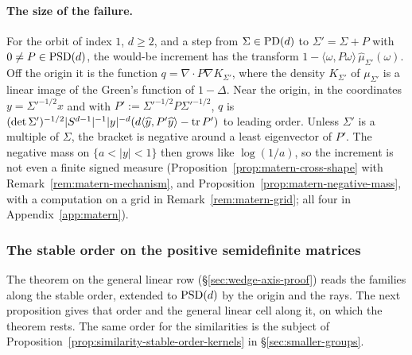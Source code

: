 \paragraph{The size of the failure.} For the \Matern{} orbit of index $1$, $d \ge 2$, and a step from
$\Sigma \in \mathrm{PD}(d)$ to $\Sigma' = \Sigma + P$ with $0 \ne P \in \mathrm{PSD}(d)$, the would-be increment has the
transform $1 - \langle\omega,P\omega\rangle\,\widehat\mu_{\Sigma'}(\omega)$. Off the origin it is the
function $q = \nabla\cdot P\nabla K_{\Sigma'}$, where the density $K_{\Sigma'}$ of $\mu_{\Sigma'}$ is a
linear image of the Green's function of $1 - \Delta$. Near the origin, in the coordinates
$y = \Sigma'^{-1/2}x$ and with $P' := \Sigma'^{-1/2}P\Sigma'^{-1/2}$, $q$ is
$(\det\Sigma')^{-1/2}|S^{d-1}|^{-1}|y|^{-d}(d\langle\widehat y,P'\widehat y\rangle - \operatorname{tr} P')$ to leading
order. Unless $\Sigma'$ is a multiple of $\Sigma$, the bracket is negative around a least eigenvector
of $P'$. The negative mass on $\{a < |y| < 1\}$ then grows like $\log(1/a)$, so the increment is not
even a finite signed measure
(Proposition~\ref{prop:matern-cross-shape} with Remark~\ref{rem:matern-mechanism}, and
Proposition~\ref{prop:matern-negative-mass}, with a computation on a grid in
Remark~\ref{rem:matern-grid}; all four in Appendix~\ref{app:matern}).

\subsubsection*{The stable order on the positive semidefinite matrices}

The theorem on the general linear row (\S\ref{sec:wedge-axis-proof}) reads the families along the
stable order, extended to $\mathrm{PSD}(d)$ by the origin and the rays. The next proposition gives that order
and the general linear cell along it, on which the theorem rests. The same order for the similarities
is the subject of Proposition~\ref{prop:similarity-stable-order-kernels} in \S\ref{sec:smaller-groups}.

